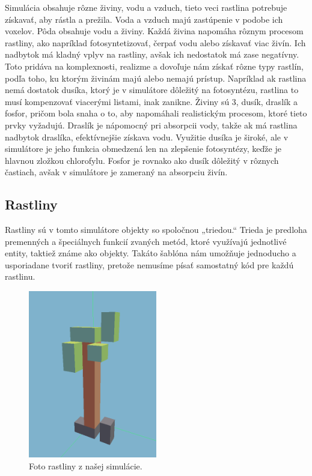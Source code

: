 \documentclass[12pt]{article}
\begin{document}
Simulácia obsahuje rôzne živiny, vodu a vzduch, tieto veci rastlina potrebuje
získavať, aby rástla a prežila. Voda a vzduch majú zastúpenie v podobe ich
voxelov. Pôda obsahuje vodu a živiny. Každá živina napomáha rôznym procesom
rastliny, ako napríklad fotosyntetizovať, čerpať vodu alebo získavať viac živín.
Ich nadbytok má kladný vplyv na rastliny, avšak ich nedostatok má zase
negatívny. Toto pridáva na komplexnosti, realizme a dovoľuje nám získať rôzne
typy rastlín, podľa toho, ku ktorým živinám majú alebo nemajú prístup.
Napríklad ak rastlina nemá dostatok dusíka, ktorý je v simulátore dôležitý
na fotosyntézu, rastlina to musí kompenzovať viacerými listami, inak zanikne.
Živiny sú 3, dusík, draslík a fosfor, pričom bola snaha o to, aby napomáhali
realistickým procesom, ktoré tieto prvky vyžadujú. Draslík je nápomocný pri
absorpcii vody, takže ak má rastlina nadbytok draslíka, efektívnejšie získava
vodu. Využitie dusíka je široké, ale v simulátore je jeho funkcia obmedzená
len na zlepšenie fotosyntézy, keďže je hlavnou zložkou chlorofylu. Fosfor je
rovnako ako dusík dôležitý v rôznych častiach, avšak v simulátore je zameraný
na absorpciu živín.

\newpage
\subsection{Rastliny}

Rastliny sú v tomto simulátore objekty so spoločnou „triedou.“ Trieda je
predloha premenných a špeciálnych funkcií zvaných metód, ktoré využívajú
jednotlivé entity, taktiež známe ako objekty. Takáto šablóna nám umožňuje
jednoducho a usporiadane tvoriť rastliny, pretože nemusíme písať samostatný
kód pre každú rastlinu.

\begin{figure}[ht]
	\centering
	\includegraphics[width=0.5\textwidth]{res/plant.png}
	\caption{Foto rastliny z našej simulácie.}
\end{figure}
\end{document}
